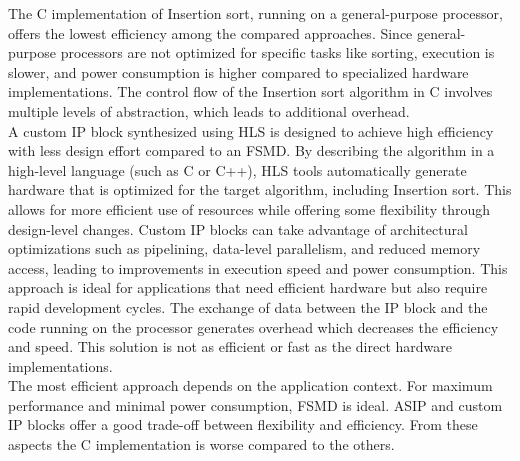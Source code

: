 \documentclass[conference]{IEEEtran}
\begin{document}
The C implementation of Insertion sort, running on a general-purpose processor, offers the lowest efficiency among the compared approaches. Since general-purpose processors are not optimized for specific tasks like sorting, execution is slower, and power consumption is higher compared to specialized hardware implementations. The control flow of the Insertion sort algorithm in C involves multiple levels of abstraction, which leads to additional overhead.\\
A custom IP block synthesized using HLS is designed to achieve high efficiency with less design effort compared to an FSMD. By describing the algorithm in a high-level language (such as C or C++), HLS tools automatically generate hardware that is optimized for the target algorithm, including Insertion sort. This allows for more efficient use of resources while offering some flexibility through design-level changes. Custom IP blocks can take advantage of architectural optimizations such as pipelining, data-level parallelism, and reduced memory access, leading to improvements in execution speed and power consumption. This approach is ideal for applications that need efficient hardware but also require rapid development cycles. The exchange of data between the IP block and the code running on the processor generates overhead which decreases the efficiency and speed. This solution is not as efficient or fast as the direct hardware implementations.\\
The most efficient approach depends on the application context. For maximum performance and minimal power consumption, FSMD is ideal. ASIP and custom IP blocks offer a good trade-off between flexibility and efficiency. From these aspects the C implementation is worse compared to the others.\\
\end{document}
